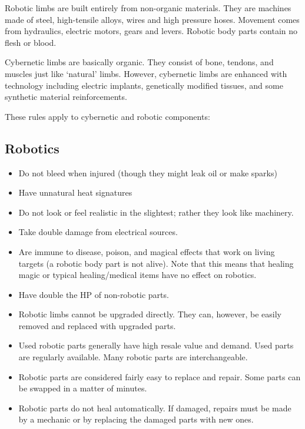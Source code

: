 \documentclass[twoside]{book}
\begin{document}
    {  
    Robotic limbs are built entirely from non-organic
             materials. They are machines made of steel, high-tensile
             alloys, wires and high pressure hoses. Movement comes from
             hydraulics, electric motors, gears and levers. Robotic body
             parts contain no flesh or blood. 
    }
  
    {  
    Cybernetic limbs are basically organic. They consist
             of bone, tendons, and muscles just like
             `natural' limbs. However, cybernetic limbs are
             enhanced with technology including electric implants,
             genetically modified tissues, and some synthetic material
             reinforcements. 
    }
  
    {  
    These rules apply to cybernetic and robotic
             components: 
    }
  
    

\subsection{Robotics}
    
\begin{itemize}
      
  \item   Do not bleed when injured (though they might leak
                 oil or make sparks) 
  \item   Have unnatural heat signatures 
  \item   Do not look or feel realistic in the slightest;
                 rather they look like machinery. 
  \item   Take double damage from electrical sources.
                 
  \item   Are immune to disease, poison, and magical
                 effects that work on living targets (a robotic body part
                 is not alive). Note that this means that healing magic
                 or typical healing/medical items have no effect on
                 robotics. 
  \item   Have double the HP of non-robotic parts. 
  \item   Robotic limbs cannot be upgraded directly. They
                 can, however, be easily removed and replaced with
                 upgraded parts. 
  \item   Used robotic parts generally have high resale
                 value and demand. Used parts are regularly available.
                 Many robotic parts are interchangeable. 
  \item   Robotic parts are considered fairly easy to
                 replace and repair. Some parts can be swapped in a
                 matter of minutes. 
  \item   Robotic parts do not heal automatically. If
                 damaged, repairs must be made by a mechanic or by
                 replacing the damaged parts with new ones. 
\end{itemize}
  
\end{document}
